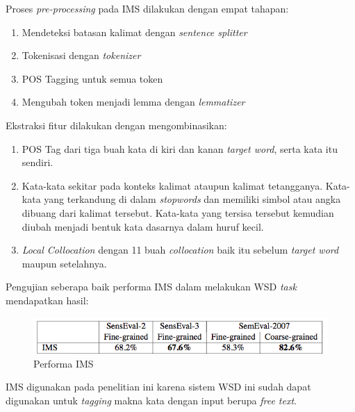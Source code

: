 Proses \textit{pre-processing} pada IMS dilakukan dengan empat tahapan:
\begin{enumerate}
	\item Mendeteksi batasan kalimat dengan \textit{sentence splitter}
	\item Tokenisasi dengan \textit{tokenizer}
	\item POS Tagging untuk semua token
	\item Mengubah token menjadi lemma dengan \textit{lemmatizer}
\end{enumerate}

Ekstraksi fitur dilakukan dengan mengombinasikan:

\begin{enumerate}
	\item POS Tag dari tiga buah kata di kiri dan kanan \textit{target word}, serta kata itu sendiri. 
	\item Kata-kata sekitar pada konteks kalimat ataupun kalimat tetangganya. Kata-kata yang terkandung di dalam \textit{stopwords} dan memiliki simbol atau angka dibuang dari kalimat tersebut. Kata-kata yang tersisa tersebut kemudian diubah menjadi bentuk kata dasarnya dalam huruf kecil.
	\item \textit{Local Collocation} dengan 11 buah \textit{collocation} baik itu sebelum \textit{target word} maupun setelahnya. 
\end{enumerate}

Pengujian seberapa baik performa IMS dalam melakukan  WSD \textit{task} mendapatkan hasil:

\begin{figure}
	\centering
	\includegraphics[width=1\linewidth]{adit_pics/Performa-IMS}
	\caption{Performa IMS \citep{zhong2010makes}}
	\label{fig:Performa-IMS}
\end{figure}

IMS digunakan pada penelitian ini karena sistem WSD ini sudah dapat digunakan untuk \textit{tagging} makna kata dengan input berupa \textit{free text}.

